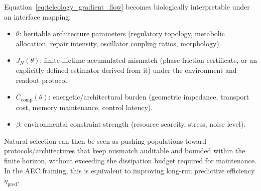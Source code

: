 Equation~\eqref{eq:teleology_gradient_flow} becomes biologically interpretable under an interface mapping:
\begin{itemize}
  \item $\theta$: heritable architecture parameters (regulatory topology, metabolic allocation, repair intensity, oscillator coupling ratios, morphology).
  \item $J_N(\theta)$: finite-lifetime accumulated mismatch (phase-friction certificate, or an explicitly defined estimator derived from it) under the environment and readout protocol.
  \item $C_{\mathrm{comp}}(\theta)$: energetic/architectural burden (geometric impedance, transport cost, memory maintenance, control latency).
  \item $\beta$: environmental constraint strength (resource scarcity, stress, noise level).
\end{itemize}
Natural selection can then be seen as pushing populations toward protocols/architectures that keep mismatch auditable and bounded within the finite horizon, without exceeding the dissipation budget required for maintenance.
In the AEC framing, this is equivalent to improving long-run predictive efficiency $\eta_{\mathrm{pred}}$.


